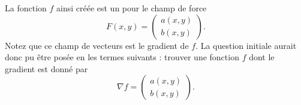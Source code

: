 La fonction \( f\) ainsi créée est un  pour le champ de force
\begin{equation}
	F(x,y)=\begin{pmatrix}
		a(x,y) \\
		b(x,y)
	\end{pmatrix}.
\end{equation}
Notez que ce champ de vecteurs est le gradient de \( f\). La question initiale aurait donc pu être posée en les termes suivants : trouver une fonction \( f\) dont le gradient est donné par
\begin{equation}
	\nabla f=\begin{pmatrix}
		a(x,y) \\
		b(x,y)
	\end{pmatrix}.
\end{equation}

